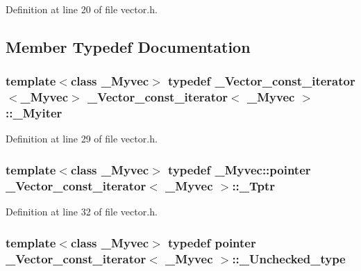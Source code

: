 Definition at line 20 of file vector.\+h.



\subsection{Member Typedef Documentation}
\hypertarget{class___vector__const__iterator_ac41cce1a95dfa665c2d7237fd94d776b}{
\subsubsection[{\+\_\+\+Myiter}]{\setlength{\rightskip}{0pt plus 5cm}template$<$class \+\_\+\+Myvec$>$ typedef {\bf \+\_\+\+Vector\+\_\+const\+\_\+iterator}$<$\+\_\+\+Myvec$>$ {\bf \+\_\+\+Vector\+\_\+const\+\_\+iterator}$<$ \+\_\+\+Myvec $>$\+::{\bf \+\_\+\+Myiter}}}\label{class___vector__const__iterator_ac41cce1a95dfa665c2d7237fd94d776b}


Definition at line 29 of file vector.\+h.

\hypertarget{class___vector__const__iterator_a9b6960b4fe0656e2e83c54e6c7757a15}{
\subsubsection[{\+\_\+\+Tptr}]{\setlength{\rightskip}{0pt plus 5cm}template$<$class \+\_\+\+Myvec$>$ typedef \+\_\+\+Myvec\+::pointer {\bf \+\_\+\+Vector\+\_\+const\+\_\+iterator}$<$ \+\_\+\+Myvec $>$\+::{\bf \+\_\+\+Tptr}}}\label{class___vector__const__iterator_a9b6960b4fe0656e2e83c54e6c7757a15}


Definition at line 32 of file vector.\+h.

\hypertarget{class___vector__const__iterator_a17897ed20e5a6c25f9b383d0f0a4bb9d}{
\subsubsection[{\+\_\+\+Unchecked\+\_\+type}]{\setlength{\rightskip}{0pt plus 5cm}template$<$class \+\_\+\+Myvec$>$ typedef {\bf pointer} {\bf \+\_\+\+Vector\+\_\+const\+\_\+iterator}$<$ \+\_\+\+Myvec $>$\+::{\bf \+\_\+\+Unchecked\+\_\+type}}}\label{class___vector__const__iterator_a17897ed20e5a6c25f9b383d0f0a4bb9d}


